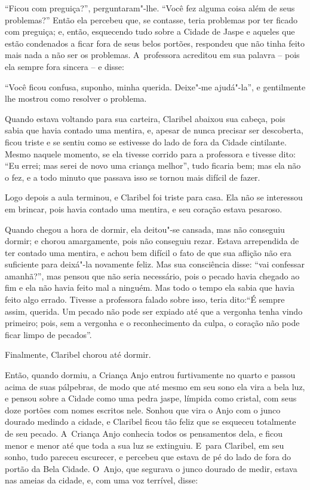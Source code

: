 ``Ficou com preguiça?'', perguntaram"-lhe. ``Você fez alguma coisa além de
seus problemas?'' Então ela percebeu que, se contasse, teria problemas por
ter ficado com preguiça; e, então, esquecendo tudo sobre a Cidade de Jaspe
e aqueles que estão condenados a ficar fora de seus belos portões,
respondeu que não tinha feito mais nada a não ser os problemas. A~professora acreditou em sua palavra -- pois ela sempre fora sincera
-- e disse:

``Você ficou confusa, suponho, minha querida. Deixe"-me ajudá"-la'', e
gentilmente lhe mostrou como resolver o problema.

Quando estava voltando para sua carteira, Claribel abaixou sua cabeça,
pois sabia que havia contado uma mentira, e, apesar de nunca
precisar ser descoberta, ficou triste e se sentiu como se estivesse do
lado de fora da Cidade cintilante. Mesmo naquele momento, se ela tivesse
corrido para a professora e tivesse dito: ``Eu errei; mas serei de novo
uma criança melhor'', tudo ficaria bem; mas ela não o fez, e a todo
minuto que passava isso se tornou mais difícil de fazer.

Logo depois a aula terminou, e Claribel foi triste para casa. Ela não se
interessou em brincar, pois havia contado uma mentira, e seu coração
estava pesaroso.

Quando chegou a hora de dormir, ela deitou"-se cansada, mas não conseguiu
dormir; e chorou amargamente, pois não conseguiu rezar. Estava
arrependida de ter contado uma mentira, e achou bem difícil o fato de que
sua aflição não era suficiente para deixá"-la novamente feliz. Mas sua
consciência disse: ``vai confessar amanhã?'', mas pensou que não
seria necessário, pois o pecado havia chegado ao fim e ela não havia
feito mal a ninguém. Mas todo o tempo ela sabia que havia feito algo errado.
Tivesse a professora falado sobre isso, teria dito:``É sempre assim,
querida. Um pecado não pode ser expiado até que a vergonha tenha vindo
primeiro; pois, sem a vergonha e o reconhecimento da culpa, o coração não
pode ficar limpo de pecados''.

Finalmente, Claribel chorou até dormir.

Então, quando dormiu, a Criança Anjo entrou furtivamente no quarto e
passou acima de suas pálpebras, de modo que até mesmo em seu sono ela
vira a bela luz, e pensou sobre a Cidade como uma pedra jaspe, límpida
como cristal, com seus doze portões com nomes escritos nele. Sonhou que
vira o Anjo com o junco dourado medindo a cidade, e Claribel ficou tão
feliz que se esqueceu totalmente de seu pecado. A~Criança Anjo conhecia
todos os pensamentos dela, e ficou menor e menor até que toda a sua luz
se extinguiu. E~para Claribel, em seu sonho, tudo pareceu
escurecer, e percebeu que estava de pé do lado de fora do portão da
Bela Cidade. O~Anjo, que segurava o junco dourado de medir, estava nas
ameias da cidade, e, com uma voz terrível, disse:

